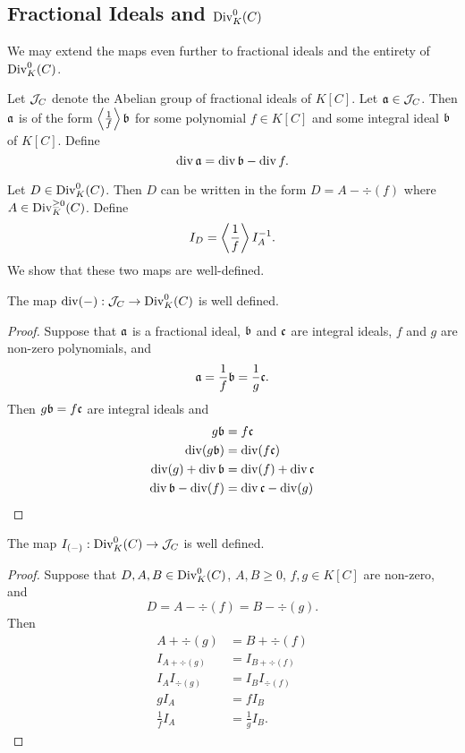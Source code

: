 
\subsection{Fractional Ideals and $\Div_K^0(C)$}

We may extend the maps even further to fractional ideals and the entirety of $\Div_K^0(C)$.

Let $\cal J_C$ denote the Abelian group of fractional ideals of $K[C]$.
Let $\frak a \in \cal J_C$.
Then $\frak a$ is of the form $\pid{\frac 1 f} \frak b$ for some polynomial $f \in K[C]$ and some integral ideal $\frak b$ of $K[C]$.
Define
\[ \div \frak a = \div \frak b - \div f. \]

Let $D \in \Div_K^0(C)$.
Then $D$ can be written in the form $D = A - \div(f)$ where $A \in \Div_K^{\geq 0}(C)$.
Define
\[ I_D = \pid{\frac 1 f} I_A \inv. \]
We show that these two maps are well-defined.

\begin{proposition}
  The map $\div(-) : \cal J_C \to \Div_K^0(C)$ is well defined.
\end{proposition}
\begin{proof}
  Suppose that $\frak a$ is a fractional ideal,
  $\frak b$ and $\frak c$ are integral ideals,
  $f$ and $g$ are non-zero polynomials, and
    \[ \frak a = \frac 1 f \frak b = \frac 1 g \frak c. \]
  Then $g \frak b = f \frak c$ are integral ideals and
  \begin{align*}
    g \frak b &= f \frak c \\
    \div(g \frak b) &= \div(f \frak c) \\
    \div(g) + \div \frak b &= \div(f) + \div \frak c \\
    \div \frak b - \div(f) &= \div \frak c - \div(g)
  \end{align*}
\end{proof}

\begin{proposition}
  The map $I_{(-)} : \Div_K^0(C) \to \cal J_C$ is well defined.
\end{proposition}
\begin{proof}
  Suppose that $D, A, B \in \Div_K^0(C)$, $A, B \geq 0$,
  $f, g \in K[C]$ are non-zero, and
    \[ D = A - \div(f) = B - \div(g). \]
  Then
  \begin{align*}
    A + \div(g) &= B + \div(f) \\
    I_{A + \div(g)} &= I_{B + \div(f)} \\
    I_A I_{\div(g)} &= I_B I_{\div(f)} \\
    g I_A &= f I_B \\
    \frac 1 f I_A &= \frac 1 g I_B.
  \end{align*}
\end{proof}


